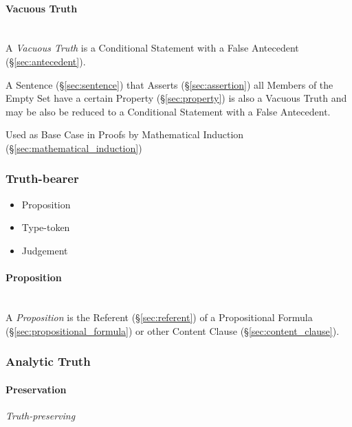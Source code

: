 \paragraph{Vacuous Truth}\label{sec:vacuous_truth}
\hfill \\

A \emph{Vacuous Truth} is a Conditional Statement with a False
Antecedent (\S\ref{sec:antecedent}).

A Sentence (\S\ref{sec:sentence}) that Asserts (\S\ref{sec:assertion})
all Members of the Empty Set have a certain Property
(\S\ref{sec:property}) is also a Vacuous Truth and may be also be
reduced to a Conditional Statement with a False Antecedent.

Used as Base Case in Proofs by Mathematical Induction
(\S\ref{sec:mathematical_induction})



\subsubsection{Truth-bearer}\label{sec:truth_bearer}

\begin{itemize}
  \item Proposition
  \item Type-token
  \item Judgement
\end{itemize}



\paragraph{Proposition}\label{sec:proposition}\hfill \\

A \emph{Proposition} is the Referent (\S\ref{sec:referent}) of a
Propositional Formula (\S\ref{sec:propositional_formula}) or other
Content Clause (\S\ref{sec:content_clause}).



\subsubsection{Analytic Truth}\label{sec:analytic_truth}

\paragraph{Preservation}\label{sec:preservation}

\emph{Truth-preserving}

